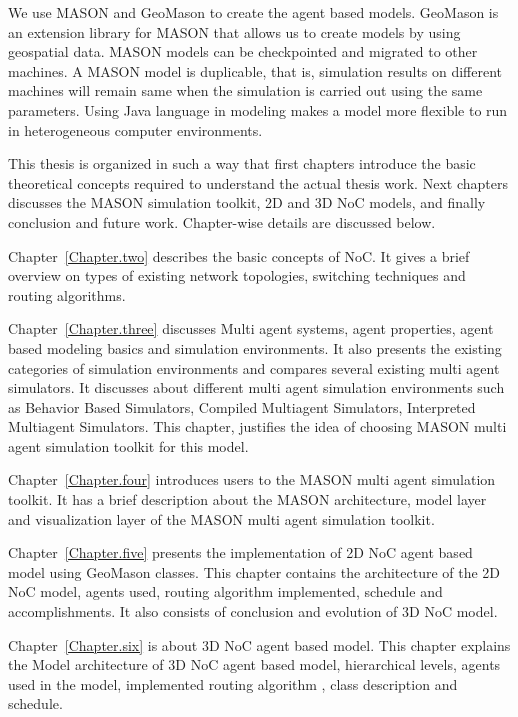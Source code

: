 We use MASON and GeoMason to create the agent based models. GeoMason is an extension library for MASON that allows us to create models by using geospatial data. MASON models can be checkpointed and migrated to other machines. A MASON model is duplicable, that is, simulation results on different machines will remain same when the simulation is carried out using the same parameters. Using Java language in modeling makes a model more flexible to run in heterogeneous computer environments.

This thesis is organized in such a way that first chapters introduce the basic theoretical concepts required to understand the actual thesis work. Next chapters discusses the MASON simulation toolkit, 2D and 3D NoC models, and finally conclusion and future work. Chapter-wise details are discussed below.

Chapter~\ref{Chapter.two} describes the basic concepts of NoC. It gives a brief overview on types of existing network topologies, switching techniques and routing algorithms.

Chapter~\ref{Chapter.three} discusses Multi agent systems, agent properties, agent based modeling basics and simulation environments. It also presents the existing categories of simulation environments and compares several existing multi agent simulators. It discusses about different multi agent simulation environments such as Behavior Based Simulators, Compiled Multiagent Simulators, Interpreted Multiagent Simulators. This chapter, justifies the idea of choosing MASON multi agent simulation toolkit for this model.

Chapter~\ref{Chapter.four} introduces users to the MASON multi agent simulation toolkit. It has a brief description about the MASON architecture, model layer and visualization layer of the MASON multi agent simulation toolkit.

Chapter~\ref{Chapter.five} presents the implementation of 2D NoC agent based model using GeoMason classes. This chapter contains the architecture of the 2D NoC model, agents used, routing algorithm implemented, schedule and accomplishments. It also consists of conclusion and evolution of 3D NoC model.

Chapter~\ref{Chapter.six} is about 3D NoC agent based model. This chapter explains the Model architecture of 3D NoC agent based model, hierarchical levels, agents used in the model, implemented routing algorithm , class description and schedule.

